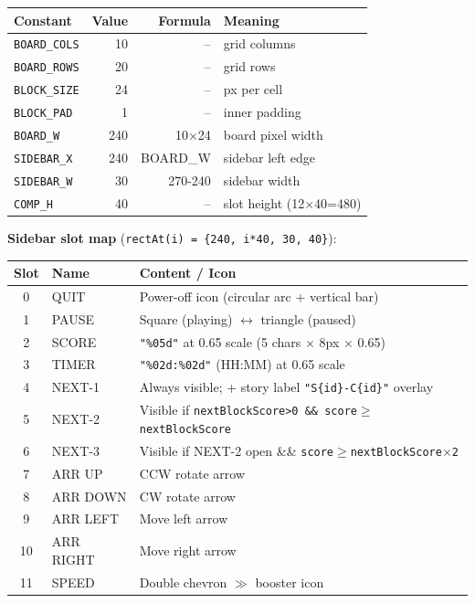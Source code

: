 \documentclass[12pt,a4paper]{article}
\begin{document}
\begin{center}\small
\begin{tabular}{@{}l r r l@{}}
\hline
\textbf{Constant} & \textbf{Value} & \textbf{Formula} & \textbf{Meaning} \\
\hline
\texttt{BOARD\_COLS}  & 10 & --  & grid columns \\
\texttt{BOARD\_ROWS}  & 20 & --  & grid rows \\
\texttt{BLOCK\_SIZE}  & 24 & --  & px per cell \\
\texttt{BLOCK\_PAD}   &  1 & --  & inner padding \\
\texttt{BOARD\_W}     & 240 & 10×24 & board pixel width \\
\texttt{SIDEBAR\_X}   & 240 & BOARD\_W & sidebar left edge \\
\texttt{SIDEBAR\_W}   &  30 & 270-240 & sidebar width \\
\texttt{COMP\_H}      &  40 & -- & slot height (12×40=480) \\
\hline
\end{tabular}
\end{center}

\noindent\textbf{Sidebar slot map} (\texttt{rectAt(i) = \{240, i*40, 30, 40\}}):

\begin{center}\small
\begin{tabular}{@{}c l l@{}}
\hline
\textbf{Slot} & \textbf{Name} & \textbf{Content / Icon} \\
\hline
0 & QUIT      & Power-off icon (circular arc + vertical bar) \\
1 & PAUSE     & Square (playing) $\leftrightarrow$ triangle (paused) \\
2 & SCORE     & \foreignlanguage{english}{\texttt{"\%05d"}} at 0.65 scale (5 chars $\times$ 8px $\times$ 0.65) \\
3 & TIMER     & \foreignlanguage{english}{\texttt{"\%02d:\%02d"}} (HH:MM) at 0.65 scale \\
4 & NEXT-1    & Always visible; + story label \foreignlanguage{english}{\texttt{"S\{id\}-C\{id\}"}} overlay \\
5 & NEXT-2    & Visible if \texttt{nextBlockScore>0 \&\& score$\geq$nextBlockScore} \\
6 & NEXT-3    & Visible if NEXT-2 open \&\& \texttt{score$\geq$nextBlockScore$\times$2} \\
7 & ARR UP    & CCW rotate arrow \\
8 & ARR DOWN  & CW rotate arrow \\
9 & ARR LEFT  & Move left arrow \\
10 & ARR RIGHT & Move right arrow \\
11 & SPEED    & Double chevron $\gg$ booster icon \\
\hline
\end{tabular}
\end{center}
\end{document}
